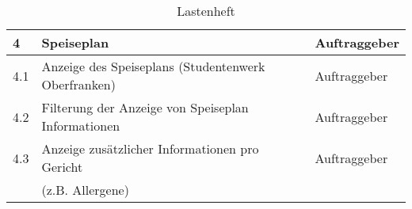 \begin{table}[H]
\begin{center}
\begin{tabular}{| l | l | l |}
\hline    
\rowcolor{LGray} 						
4		& Speiseplan											& Auftraggeber \\
\hline
4.1		& Anzeige des Speiseplans (Studentenwerk Oberfranken)	& Auftraggeber \\
\hline
4.2		& Filterung der Anzeige von Speiseplan Informationen	& Auftraggeber \\
\hline
4.3		& Anzeige zusätzlicher Informationen pro Gericht 		& Auftraggeber \\
		& (z.B. Allergene)										& 			   \\
\hline

\end{tabular}
  \end{center}
\caption[Lastenheft]{Lastenheft}
\label{tab:lastenheft}
\end{table}

\newpage

